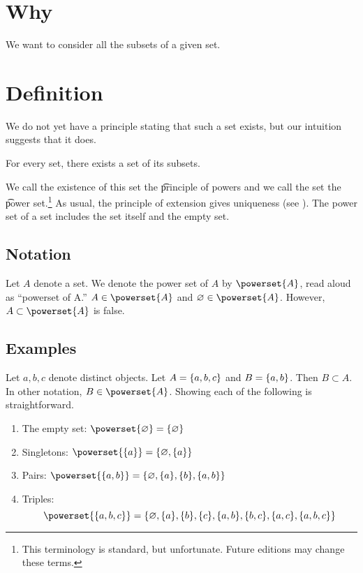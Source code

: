 

\section*{Why}

We want to consider all the subsets of a given set.

\section*{Definition}

We do not yet have a principle stating that such a set exists, but our intuition suggests that it does.

\begin{principle}[powers]
For every set, there exists a set of its subsets.
\end{principle}

We call the existence of this set the \t{principle of powers} and we call the set the \t{power set}.\footnote{This terminology is standard, but unfortunate. Future editions may change these terms.}
As usual, the principle of extension gives uniqueness (see ).
The power set of a set includes the set itself and the empty set.

\subsection*{Notation}

Let $A$ denote a set.
We denote the power set of $A$ by $\powerset{A}$, read aloud as ``powerset of A.''
$A \in \powerset{A}$ and $\varnothing \in \powerset{A}$.
However, $A \subset \powerset{A}$ is false.

\subsection*{Examples}

Let $a, b, c$ denote distinct objects. Let $A = \{a, b ,c\}$
and $B = \{a, b\}$. Then
$B \subset A$.
In other notation,
$B \in \powerset{A}$.
Showing each of the following is straightforward.
  \begin{enumerate}
    \item The empty set: $\powerset{\varnothing} = \set{\varnothing}$
    \item Singletons: $\powerset{\set{a}} = \set{\varnothing, \set{a}}$
    \item Pairs: $\powerset{\set{a, b}} = \set{\varnothing, \set{a}, \set{b}, \set{a, b}}$
    \item Triples:
\[
\powerset{\set{a, b, c}} =
\{
\varnothing,
\set{a},
\set{b},
\set{c},
\set{a, b},
\set{b, c},
\set{a, c},
\set{a, b, c}
\}
\]
  \end{enumerate}

